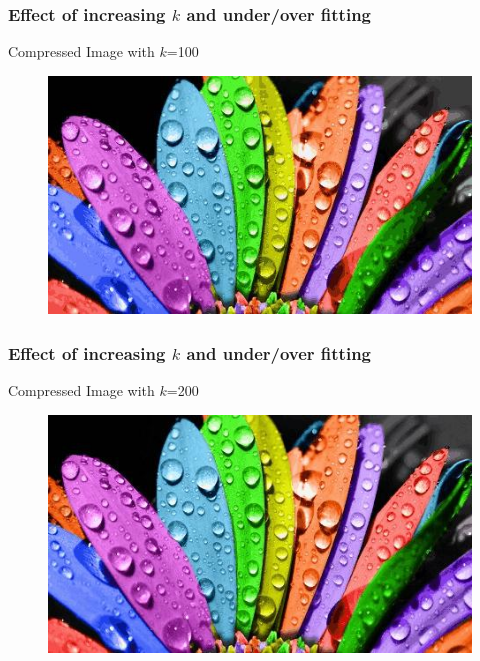 \documentclass{beamer}
\begin{document}
\begin{frame}
\frametitle{Effect of increasing $k$ and under/over fitting}
\begin{center}
Compressed Image with $k$=100
\end{center}
\begin{figure}
\includegraphics[scale=0.7]{flower_compressed_100.jpg}
\end{figure}
\end{frame}


\begin{frame}
\frametitle{Effect of increasing $k$ and under/over fitting}
\begin{center}
Compressed Image with $k$=200
\end{center}
\begin{figure}
\includegraphics[scale=0.7]{flower_compressed_200.jpg}
\end{figure}
\end{frame}
\end{document}
